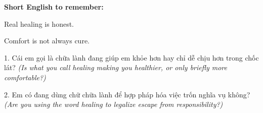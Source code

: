 \begin{ghinhoanh}
\textbf{Short English to remember:}

Real healing is honest.

Comfort is not always cure.
\end{ghinhoanh}

\begin{tuhocnhanh}
1. Cái em gọi là chữa lành đang giúp em khỏe hơn hay chỉ dễ chịu hơn trong chốc lát? \textit{(Is what you call healing making you healthier, or only briefly more comfortable?)}

2. Em có đang dùng chữ chữa lành để hợp pháp hóa việc trốn nghĩa vụ không? \textit{(Are you using the word healing to legalize escape from responsibility?)}
\end{tuhocnhanh}

\ngancach
